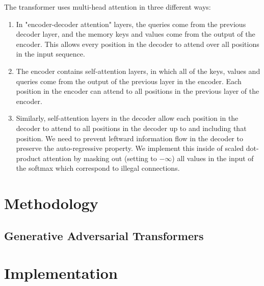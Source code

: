 \documentclass{article}
\begin{document}
	The transformer uses multi-head attention in three different ways:
	\begin{enumerate}
		\item In "encoder-decoder attention" layers, the queries come from the previous decoder layer, 
		and the memory keys and values come from the output of the encoder. This allows every position 
		in the decoder to attend over all positions in the input sequence.
		\item The encoder contains self-attention layers, in which all of the keys, values 
		and queries come from the output of the previous layer in the encoder. 
		Each position in the encoder can attend to all positions in the previous layer of the encoder.
		\item Similarly, self-attention layers in the decoder allow each position in the decoder to attend to 
		all positions in the decoder up to and including that position. We need to prevent leftward 
		information flow in the decoder to preserve the auto-regressive property. We implement this 
		inside of scaled dot-product attention by masking out (setting to $-\infty$) all values in the input 
		of the softmax which correspond to illegal connections. 
	\end{enumerate}

	
	\section{Methodology}
	
	\subsection{Generative Adversarial Transformers}
	
	\section{Implementation}
	
\end{document}
